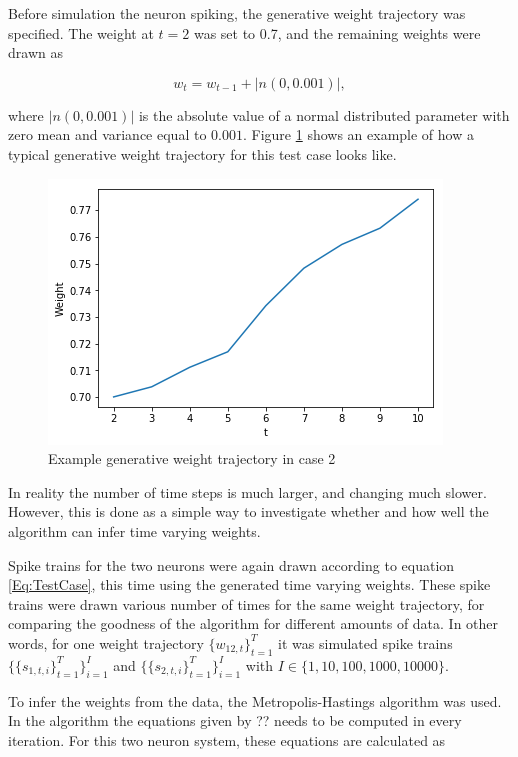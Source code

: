 Before simulation the neuron spiking, the generative weight trajectory was specified. The weight at $t=2$ was set to 0.7, and the remaining weights were drawn as

\begin{equation}
    w_{t} = w_{t-1} + |n(0,0.001)|,
\end{equation}

where $|n(0,0.001)|$ is the absolute value of a normal distributed parameter with zero mean and variance equal to $0.001$. Figure \ref{fig:Generative} shows an example of how a typical generative weight trajectory for this test case looks like. 

\begin{figure}
\caption{Example generative weight trajectory in case 2}
\label{fig:Generative}
    \centering
    \includegraphics[scale=0.8]{fig/UL.png}
\end{figure}


In reality the number of time steps is much larger, and changing much slower. However, this is done as a simple way to investigate whether and how well the algorithm can infer time varying weights. 

Spike trains for the two neurons were again drawn according to equation \ref{Eq:TestCase}, this time using the generated time varying weights. These spike trains were drawn various number of times for the same weight trajectory, for comparing the goodness of the algorithm for different amounts of data. In other words, for one weight trajectory $\{w_{12,t}\}_{t=1}^T$ it was simulated spike trains
$\{\{s_{1,t,i}\}_{t=1}^T\}_{i=1}^I$ and $\{\{s_{2,t,i}\}_{t=1}^T\}_{i=1}^I$ with $I \in \{1,10,100,1000,10000 \}$.

To infer the weights from the data, the Metropolis-Hastings algorithm was used. In the algorithm the equations given by ?? needs to be computed in every iteration. For this two neuron system, these equations are calculated as

